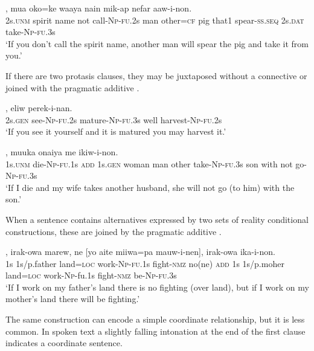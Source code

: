 \ea%
\label{ex:8:x1644}
,  mua  oko=ke  waaya nain  mik-ap  nefar  aaw-i-non.\\
2s.\textsc{unm} spirit  name  not  call-\textsc{Np}-\textsc{fu}.2s man  other=\textsc{cf}  pig that1  spear-\textsc{ss}.\textsc{seq} 2s.\textsc{dat} take-\textsc{Np}-\textsc{fu}.3s\\
\glt`If you don't call the spirit name, another man will spear the pig and take it from you.'
\z


If there are two protasis clauses, they may be juxtaposed without a connective  or joined with the pragmatic additive  .

\ea%
\label{ex:8:x1635}
,  eliw  perek-i-nan.\\
2s.\textsc{gen} see-\textsc{Np}-\textsc{fu}.2s mature-\textsc{Np}-\textsc{fu}.3s well harvest-\textsc{Np}-\textsc{fu}.2s\\
\glt`If you see it yourself and it is matured you may harvest it.'
\z


\ea%
\label{ex:8:x1643}
, muuka  onaiya  me  ikiw-i-non.\\
1s.\textsc{unm} die-\textsc{Np}-\textsc{fu}.1s \textsc{add} 1s.\textsc{gen} woman  man  other take-\textsc{Np}-\textsc{fu}.3s son  with  not  go-\textsc{Np}-\textsc{fu}.3s\\
\glt`If I die and my wife takes another husband, she will not go (to him) with the son.'
\z


When a sentence contains alternatives expressed by two sets of reality conditional constructions, these are joined by the pragmatic additive .

\ea%
\label{ex:8:x1642}
\gll [Yo  auwa  miiwa=pa  mauw-i-nen],  irak-owa  marew,  ne [yo  aite  miiwa=pa  mauw-i-nen],  irak-owa  ika-i-non.\\
1s  1s/p.father  land=\textsc{loc} work-\textsc{Np}-\textsc{fu}.1s  fight-\textsc{nmz} no(ne) \textsc{add} 1s 1s/p.moher land=\textsc{loc}  work-\textsc{Np}-fu.1s fight-\textsc{nmz} be-\textsc{Np}-\textsc{fu}.3s\\
\glt`If I work on my father's land there is no fighting (over land), but if I work on my mother's land there will be fighting.'
\z


The same construction can encode a simple coordinate relationship, but it is less common. In spoken text a slightly falling intonation at the end of the first clause indicates a coordinate sentence.

